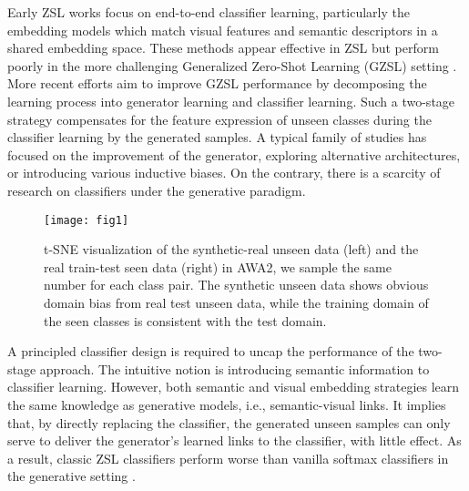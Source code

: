 \documentclass{article}
\begin{document}
	Early ZSL works focus on end-to-end classifier learning, particularly the embedding models \cite{lampert2013attribute,li2019rethinking} which match visual features and semantic descriptors in a shared embedding space. These methods appear effective in ZSL but perform poorly in the more challenging Generalized Zero-Shot Learning (GZSL) setting \cite{chao2016empirical,xian2017zero}. More recent efforts \cite{xian2018feature,shen2020invertible} aim to improve GZSL performance by decomposing the learning process into generator learning and classifier learning. Such a two-stage strategy compensates for the feature expression of unseen classes during the classifier learning by the generated samples. A typical family of studies has focused on the improvement of the generator, exploring alternative architectures, or introducing various inductive biases. On the contrary, there is a scarcity of research on classifiers under the generative paradigm.
		\begin{figure}[t]
		\centering
\texttt{[image: fig1]}
		\vspace{-1.5ex}
		\caption{t-SNE visualization of the synthetic-real unseen data (left) and the real train-test seen data (right) in AWA2, we sample the same number for each class pair. The synthetic unseen data shows obvious domain bias from real test unseen data, while the training domain of the seen classes is consistent with the test domain.}
		\vspace{-2ex}
		\label{fig1}
	\end{figure}
    
	A principled classifier design is required to uncap the performance of the two-stage approach. The intuitive notion is introducing semantic information to classifier learning. However, both semantic and visual embedding strategies learn the same knowledge as generative models, i.e., semantic-visual links. It implies that, by directly replacing the classifier, the generated unseen samples can only serve to deliver the generator's learned links to the classifier, with little effect. As a result, classic ZSL classifiers perform worse than vanilla softmax classifiers in the generative setting \cite{xian2018feature}.
\end{document}
